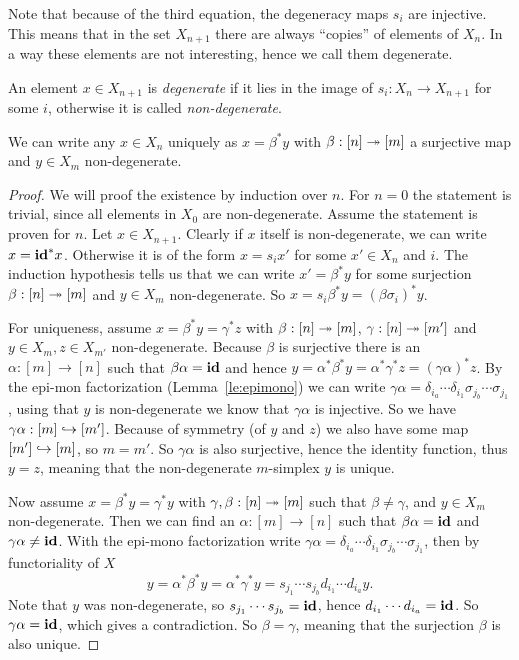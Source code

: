 Note that because of the third equation, the degeneracy maps $s_i$ are injective. This means that in the set $X_{n+1}$ there are always ``copies'' of elements of $X_n$. In a way these elements are not interesting, hence we call them degenerate.
\begin{definition}
	An element $x \in X_{n+1}$ is \emph{degenerate} if it lies in the image of $s_i: X_n \to X_{n+1}$ for some $i$, otherwise it is called \emph{non-degenerate}.
\end{definition}
\begin{lemma}
	\label{le:non-degenerate}
	We can write any $x \in X_n$ uniquely as $x = \beta^\ast y$ with $\beta: [n] \twoheadrightarrow [m]$ a surjective map and $y \in X_m$ non-degenerate.
\end{lemma}
\begin{proof}
	We will proof the existence by induction over $n$. For $n=0$ the statement is trivial, since all elements in $X_0$ are non-degenerate. Assume the statement is proven for $n$. Let $x \in X_{n+1}$. Clearly if $x$ itself is non-degenerate, we can write $x = \mathbf{id}^\ast x$. Otherwise it is of the form $x = s_i x'$ for some $x' \in X_n$ and $i$. The induction hypothesis tells us that we can write $x' = \beta^\ast y$ for some surjection $\beta: [n] \twoheadrightarrow [m]$ and $y \in X_m$ non-degenerate. So $x = s_i \beta^\ast y = (\beta \sigma_i)^\ast y$.

	For uniqueness, assume $x = \beta^\ast y = \gamma^\ast z$ with $\beta: [n] \twoheadrightarrow [m]$, $\gamma: [n] \twoheadrightarrow [m']$ and $y \in X_m, z \in X_{m'}$ non-degenerate. Because $\beta$ is surjective there is an $\alpha:[m]\to[n]$ such that $\beta\alpha = \mathbf{id}$ and hence $y = \alpha^\ast \beta^\ast y = \alpha^\ast \gamma^\ast z = (\gamma\alpha)^\ast z$. By the epi-mon factorization (Lemma~\ref{le:epimono}) we can write $\gamma\alpha = \delta_{i_a} \cdots \delta_{i_1} \sigma_{j_b} \cdots \sigma_{j_1}$, using that $y$ is non-degenerate we know that $\gamma\alpha$ is injective. So we have $\gamma\alpha: [m] \hookrightarrow [m']$. Because of symmetry (of $y$ and $z$) we also have some map $[m'] \hookrightarrow[m]$, so $m = m'$. So $\gamma\alpha$ is also surjective, hence the identity function, thus $y = z$, meaning that the non-degenerate $m$-simplex $y$ is unique.

	Now assume $x = \beta^\ast y = \gamma^\ast y$ with $\gamma, \beta: [n] \twoheadrightarrow [m]$ such that $\beta \neq \gamma$, and $y \in X_m$ non-degenerate. Then we can find an $\alpha:[m]\to[n]$ such that $\beta\alpha = \mathbf{id}$ and $\gamma\alpha \neq \mathbf{id}$. With the epi-mono factorization write $\gamma\alpha = \delta_{i_a} \cdots \delta_{i_1} \sigma_{j_b} \cdots \sigma_{j_1}$, then by functoriality of $X$
	$$ y = \alpha^\ast \beta^\ast y = \alpha^\ast \gamma^\ast y = s_{j_1} \cdots s_{j_b} d_{i_1} \cdots d_{i_a} y. $$
	Note that $y$ was non-degenerate, so $s_{j_1} \cdots s_{j_b} = \mathbf{id}$, hence $d_{i_1} \cdots d_{i_a} = \mathbf{id}$. So $\gamma\alpha = \mathbf{id}$, which gives a contradiction. So $\beta = \gamma$, meaning that the surjection $\beta$ is also unique.
\end{proof}

